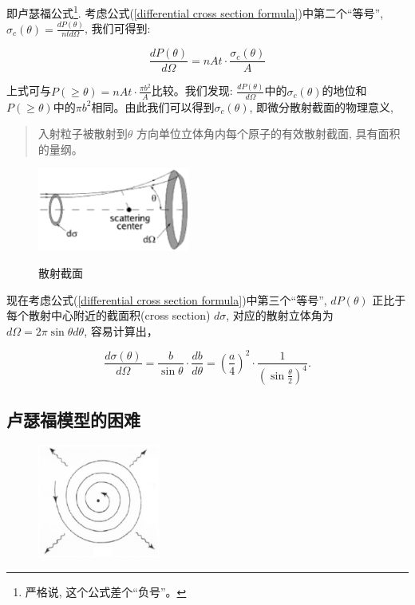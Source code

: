 即卢瑟福公式\footnote{严格说, 这个公式差个``负号''。}.
考虑公式(\ref{differential cross section formula})中第二个``等号'',
$\sigma_c(\theta) = \frac{dP(\theta)}{nt d \Omega}$, 我们可得到:

\begin{equation}
    \frac{dP(\theta)}{d \Omega}
    = nAt \cdot \frac{\sigma_c (\theta)}{A}
\end{equation}

上式可与$P(\ge \theta) = nAt \cdot \frac{\pi b^2}{A}$比较。我们发现:
$\frac{dP(\theta)}{d \Omega}$中的$\sigma_c (\theta)$的地位和$P(\ge
\theta)$中的$\pi b^2$相同。由此我们可以得到$\sigma_c(\theta)$,
即微分散射截面的物理意义,


\begin{quote}
入射粒子被散射到$\theta $ 方向单位立体角内每个原子的有效散射截面,
具有面积的量纲。
\end{quote}

\begin{figure}[h]
\begin{center}
  \includegraphics[width=5cm]{AtomIdea/cross_section.ps}\\
  \caption{散射截面}
\end{center}
\end{figure}



现在考虑公式(\ref{differential cross section
formula})中第三个``等号'', $d P(\theta)$
正比于每个散射中心附近的截面积(cross section) $d \sigma$,
对应的散射立体角为 $d \Omega = 2 \pi \sin \theta d \theta$,
容易计算出，

\begin{equation}
\frac{d \sigma (\theta)}{d \Omega} = \frac{b}{\sin \theta} \cdot
\frac{db}{d \theta} = (\frac{a}{4})^2 \cdot \frac{1}{(\sin
\frac{\theta}{2})^4} .
\end{equation}

\subsection{卢瑟福模型的困难}

\begin{figure}[h]
\begin{center}
  \includegraphics[width=4cm]{AtomIdea/spiral.ps}\\
\end{center}
\end{figure}


